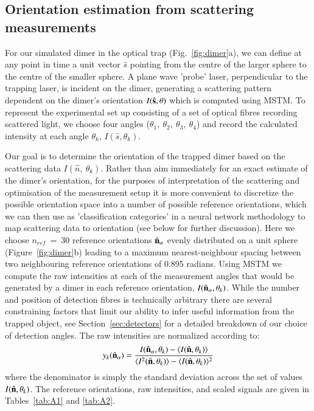 \documentclass[final,  3p]{elsarticle}
\begin{document}
\subsection{Orientation estimation from scattering measurements}
\label{sec:Bayes}

For our simulated dimer in the optical trap (Fig.~\ref{fig:dimer}a), we can define at any point in time a unit vector $\hat{s}$ pointing from the centre of the larger sphere to the centre of the smaller sphere. A plane wave 'probe' laser, perpendicular to the trapping laser, is incident on the dimer, generating a scattering pattern  dependent on the dimer's orientation $I(\hat{\bf s}, \theta)$ which is computed using MSTM. To represent the experimental set up consisting of a set of optical fibres recording scattered light, we choose four angles  ($\theta_1, \ \theta_2, \ \theta_3, \ \theta_4$) and record the calculated intensity at each angle $\theta_k$, $I(\hat{s}, \theta_k)$. 

Our goal is to determine the orientation of the trapped dimer based on the scattering data $I(\hat{n}, \ \theta_k)$. Rather than aim immediately for an exact estimate of the dimer's orientation, for the purposes of interpretation of the scattering and optimisation of the measurement setup it is more convenient to discretize the possible orientation space into a number of possible reference orientations, which we can then use as 'classification categories' in a neural network methodology to map scattering data to orientation (see below for further discussion).  Here we choose $\textit{n}_{ref} \ = \ 30$ reference orientations $\hat{\bf n}_{\alpha}$  evenly distributed on a unit sphere \cite{Rey2006} (Figure~\ref{fig:dimer}b) leading to a maximum nearest-neighbour spacing between two neighbouring reference orientations of 0.895 radians. Using MSTM we compute the raw intensities at each of the measurement angles that would be generated by a dimer in each reference orientation, $I(\hat{\bf n}_{\alpha}, \theta_k)$. While the number and position of detection fibres is technically arbitrary there are several constraining factors that limit our ability to infer useful information from the trapped object, see Section~\ref{sec:detectors} for a detailed breakdown of our choice of detection angles. The raw intensities are normalized according to:
\begin{align}
\label{eq:scale}
  y_k(\hat{\bf n}_\alpha)
  = 
  \frac{I(\hat{\bf n}_\alpha, \theta_k) - \langle I(\hat{\bf n},\theta_k) \rangle } 
  {\langle I^2(\hat{\bf n},\theta_k) \rangle -\langle I(\hat{\bf n}, \theta_k)\rangle^2}
\end{align}
where the denominator is simply the standard deviation across the set of values $I(\hat{\bf n}, \theta_k)$. The reference orientations, raw intensities, and scaled signals are given in Tables~\ref{tab:A1} and \ref{tab:A2}. 
\end{document}

